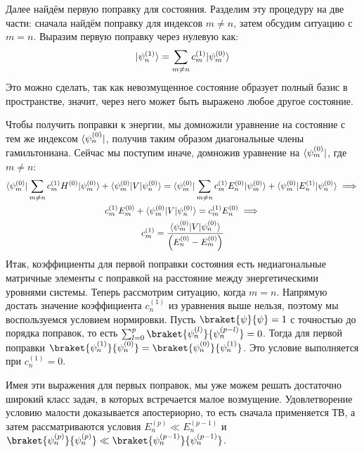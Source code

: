 Далее найдём первую поправку для состояния. Разделим эту процедуру на две
части: сначала найдём поправку для индексов $m \neq n$, затем обсудим ситуацию
с $m = n$. Выразим первую поправку через нулевую как:
\[
  \lvert\psi^{(1)}_n\rangle = \sum\limits_{m\neq n}c_m^{(1)}\lvert\psi^{(0)}_m\rangle
\]
Это можно сделать, так как невозмущенное состояние образует полный базис в
пространстве, значит, через него может быть выражено любое другое состояние.

Чтобы получить поправки к энергии, мы домножили уравнение на состояние с тем же
индексом $\langle\psi^{(0)}_n\rvert$, получив таким образом диагональные члены
гамильтониана. Сейчас мы поступим иначе, домножив уравнение на
$\langle\psi^{(0)}_m\rvert$, где $m\neq n$:
\begin{gather*}
  \langle\psi^{(0)}_m\rvert\sum\limits_{m\neq n}c^{(1)}_mH^{(0)}\lvert\psi^{(0)}_m\rangle + \langle\psi^{(0)}_m\rvert V\lvert\psi^{(0)}_n\rangle = \langle\psi^{(0)}_m\rvert\sum\limits_{m\neq n}c^{(1)}_mE^{(0)}_n\lvert\psi^{(0)}_m\rangle + \langle\psi^{(0)}_m\rvert E^{(1)}_n\lvert\psi^{(0)}_n\rangle\implies\\
  c^{(1)}_m E^{(0)}_m + \langle\psi^{(0)}_m\rvert V\lvert\psi^{(0)}_n\rangle = c^{(1)}_m E^{(0)}_n \implies\\
  c^{(1)}_m  =  \frac{\langle\psi^{(0)}_m\rvert V\lvert\psi^{(0)}_n\rangle}{\left(E^{(0)}_n - E^{(0)}_m\right)}
\end{gather*}
Итак, коэффициенты для первой поправки состояния есть недиагональные матричные
элементы с поправкой на расстояние между энергетическими уровнями системы.
Теперь рассмотрим ситуацию, когда $m=n$. Напрямую достать значение коэффициента
$c^{(1)}_n$ из уравнения выше нельзя, поэтому мы воспользуемся условием
нормировки. Пусть $\braket{\psi}{\psi} = 1$ с точностью до порядка поправок, то
есть $\sum_{l=0}^{p}\braket{\psi^{(l)}_n}{\psi^{(p-l)}_n} = 0$. Тогда для
первой поправки $\braket{\psi^{(1)}_n}{\psi^{(0)}_n} =
  \braket{\psi^{(0)}_n}{\psi^{(1)}_n}$. Это условие выполняется при $c^{(1)}_n =
  0$.

Имея эти выражения для первых поправок, мы уже можем решать достаточно широкий
класс задач, в которых встречается малое возмущение. Удовлетворение условию
малости доказывается апостериорно, то есть сначала применяется ТВ, а затем
рассматриваются условия $E^{(p)}_n \ll E^{(p-1)}_n$ и
$\braket{\psi^{(p)}_n}{\psi^{(p)}_n} \ll
  \braket{\psi^{(p-1)}_n}{\psi^{(p-1)}_n}$.

